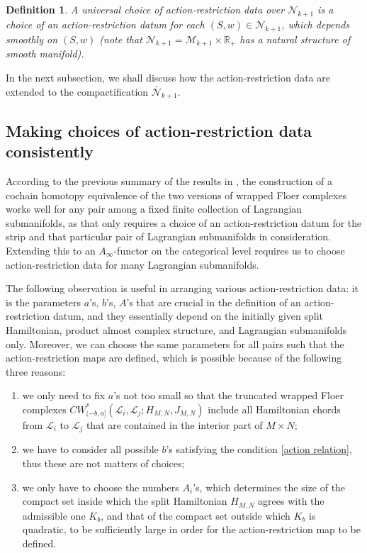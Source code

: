 \documentclass{amsart}
\newtheorem{definition}[theorem]{Definition}
\numberwithin{equation}{section}
\numberwithin{figure}{section}
\begin{document}
\begin{definition}
	A universal choice of action-restriction data over $\mathcal{N}_{k+1}$ is a choice of an action-restriction datum for each $(S, w) \in \mathcal{N}_{k+1}$, which depends smoothly on $(S, w)$ (note that $\mathcal{N}_{k+1} = \mathcal{M}_{k+1} \times \mathbb{R}_{+}$ has a natural structure of smooth manifold).
\end{definition}

	In the next subsection, we shall discuss how the action-restriction data are extended to the compactification $\bar{\mathcal{N}}_{k+1}$. \par

\subsection{Making choices of action-restriction data consistently}
	According to the previous summary of the results in \cite{Gao1}, the construction of a cochain homotopy equivalence of the two versions of wrapped Floer complexes works well for any pair among a fixed finite collection of Lagrangian submanifolds, as that only requires a choice of an action-restriction datum for the strip and that particular pair of Lagrangian submanifolds in consideration. Extending this to an $A_{\infty}$-functor on the categorical level requires us to choose action-restriction data for many Lagrangian submanifolds. \par
	The following observation is useful in arranging various action-restriction data: it is the parameters $a$'s, $b$'s, $A$'s that are crucial in the definition of an action-restriction datum, and they essentially depend on the initially given split Hamiltonian, product almost complex structure, and Lagrangian submanifolds only. Moreover, we can choose the same parameters for all pairs such that the action-restriction maps are defined, which is possible because of the following three reasons:
\begin{enumerate}[label=(\roman*)]

\item  we only need to fix $a$'s not too small so that the truncated wrapped Floer complexes $CW^{*}_{(-b, a]}(\mathcal{L}_{i}, \mathcal{L}_{j}; H_{M, N}, J_{M, N})$ include all Hamiltonian chords from $\mathcal{L}_{i}$ to $\mathcal{L}_{j}$ that are contained in the interior part of $M \times N$;

\item we have to consider all possible $b$'s satisfying the condition \eqref{action relation}, thus these are not matters of choices;

\item we only have to choose the numbers $A_{i}$'s, which determines the size of the compact set inside which the split Hamiltonian $H_{M, N}$ agrees with the admissible one $K_{b}$, and that of the compact set outside which $K_{b}$ is quadratic, to be sufficiently large in order for the action-restriction map to be defined.

\end{enumerate} \par
\end{document}
